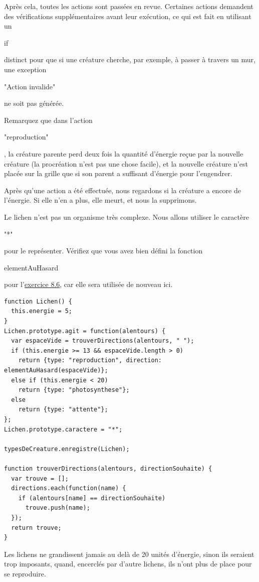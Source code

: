 \documentclass{FramateX}
\renewcommand{\texttt}[1]{\begin{sffamily}{#1}\end{sffamily}}
\begin{document}
Après cela, toutes les actions sont passées en revue. Certaines actions
demandent des vérifications supplémentaires avant leur exécution, ce qui
est fait en utilisant un \texttt{if} distinct pour que si une créature
cherche, par exemple, à passer à travers un mur, une exception
\texttt{"Action invalide"} ne soit pas générée.

Remarquez que dans l'action \texttt{"reproduction"}, la créature parente
perd deux fois la quantité d'énergie reçue par la nouvelle créature (la
procréation n'est pas une chose facile), et la nouvelle créature n'est
placée sur la grille que si son parent a suffisant d'énergie pour
l'engendrer.

Après qu'une action a été effectuée, nous regardons si la créature a
encore de l'énergie. Si elle n'en a plus, elle meurt, et nous la
supprimons.

\begin{center}\end{center}

Le lichen n'est pas un organisme très complexe. Nous allons utiliser le
caractère \texttt{"*"} pour le représenter. Vérifiez que vous avez bien
défini la fonction \texttt{elementAuHasard} pour
l'\href{chapter8.html\#exercise6}{exercice 8.6}, car elle sera utilisée
de nouveau ici.

\begin{lstlisting}
function Lichen() {
  this.energie = 5;
}
Lichen.prototype.agit = function(alentours) {
  var espaceVide = trouverDirections(alentours, " ");
  if (this.energie >= 13 && espaceVide.length > 0)
    return {type: "reproduction", direction: elementAuHasard(espaceVide)};
  else if (this.energie < 20)
    return {type: "photosynthese"};
  else
    return {type: "attente"};
};
Lichen.prototype.caractere = "*";

typesDeCreature.enregistre(Lichen);

function trouverDirections(alentours, directionSouhaite) {
  var trouve = [];
  directions.each(function(name) {
    if (alentours[name] == directionSouhaite)
      trouve.push(name);
  });
  return trouve;
}
\end{lstlisting}
Les lichens ne grandissent jamais au delà de 20 unités d'énergie, sinon
ils seraient trop imposants, quand, encerclés par d'autre lichens, ils
n'ont plus de place pour se reproduire.

\begin{center}\end{center}
\end{document}
